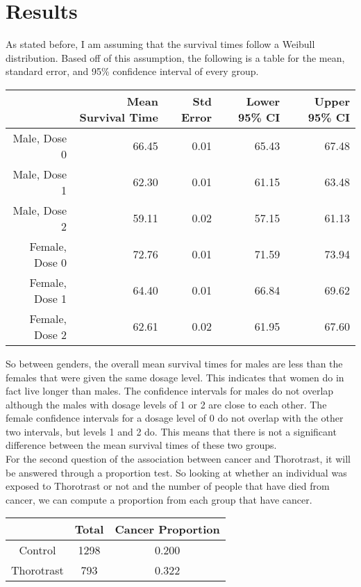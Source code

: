 \documentclass[12pt, onesided]{article}
\begin{document}
\section{Results}

\indent As stated before, I am assuming that the survival times follow a Weibull distribution. Based off of this assumption, the following is a table for the mean, standard error, and 95\% confidence interval of every group.
\begin{center}
\begin{tabular}{rrrrr}
  \hline \hline
 & Mean Survival Time & Std Error & Lower 95\% CI & Upper 95\% CI \\ 
  \hline \hline
Male, Dose  0 & 66.45 & 0.01 & 65.43 & 67.48 \\ 
  Male, Dose  1 & 62.30 & 0.01 & 61.15 & 63.48 \\ 
  Male, Dose  2 & 59.11 & 0.02 & 57.15 & 61.13 \\ 
  Female, Dose  0 & 72.76 & 0.01 & 71.59 & 73.94 \\ 
  Female, Dose  1 & 64.40 & 0.01 & 66.84 & 69.62 \\ 
  Female, Dose  2 & 62.61 & 0.02 & 61.95 & 67.60 \\ 
   \hline \hline
\end{tabular}
\end{center}

\indent So between genders, the overall mean survival times for males are less than the females that were given the same dosage level. This indicates that women do in fact live longer than males. The confidence intervals for males do not overlap although the males with dosage levels of 1 or 2 are close to each other. The female confidence intervals for a dosage level of 0 do not overlap with the other two intervals, but levels 1 and 2 do. This means that there is not a significant difference between the mean survival times of these two groups. \\

For the second question of the association between cancer and Thorotrast, it will be answered through a proportion test. So looking at whether an individual was exposed to Thorotrast or not and the number of people that have died from cancer, we can compute a proportion from each group that have cancer.

\begin{center}
    \begin{tabular}{ccc}
    \hline
    \hline
         & Total &  Cancer Proportion\\
         \hline
         \hline
       Control  & 1298 &  0.200\\
       Thorotrast & 793 &  0.322\\
       \hline \hline
    \end{tabular}
\end{center}
\end{document}
